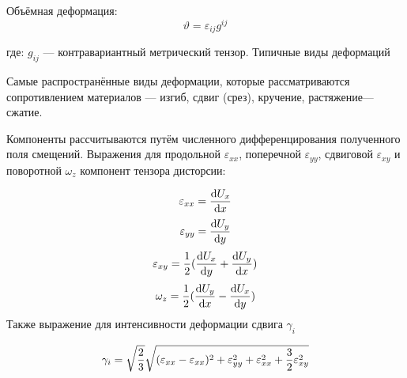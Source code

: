 Объёмная деформация: \[ \vartheta = \varepsilon_{ij} g^{ij} \]

где: $g_{ij}$ — контравариантный метрический тензор.
Типичные виды деформаций

Самые распространённые виды деформации, которые рассматриваются сопротивлением материалов — изгиб, сдвиг (срез), кручение, растяжение—сжатие.

Компоненты рассчитываются путём численного дифференцирования полученного поля смещений. Выражения для продольной $\varepsilon_{xx}$, поперечной $\varepsilon_{yy}$, сдвиговой $\varepsilon_{xy}$ и поворотной $\omega_z$ компонент тензора дисторсии:

\begin{equation}
\numberwithin{equation}{section}
\label{eq:e_xx}
\varepsilon_{xx}= \frac{\mathrm{d} U_x}{\mathrm{d} x}
\end{equation}
\begin{equation}
\numberwithin{equation}{section}
\label{eq:e_yy}
\varepsilon_{yy}= \frac{\mathrm{d} U_y}{\mathrm{d} y}
\end{equation}
\begin{equation}
\numberwithin{equation}{section}
\label{eq:e_xy}
\varepsilon_{xy}=\frac{1}{2}(\frac{\mathrm{d} U_x}{\mathrm{d} y} + \frac{\mathrm{d} U_y}{\mathrm{d} x})
\end{equation}
\begin{equation}
\numberwithin{equation}{section}
\label{eq:w_z}
\omega_z=\frac{1}{2}(\frac{\mathrm{d} U_y}{\mathrm{d} x} - \frac{\mathrm{d} U_x}{\mathrm{d} y})
\end{equation}
Также выражение для интенсивности деформации сдвига $\gamma_i$

\begin{equation}
\numberwithin{equation}{section}
\label{eq:gamma_i}
\gamma_i = \sqrt\frac{2}{3}\sqrt{(\varepsilon_{xx}-\varepsilon_{xx})^2+\varepsilon_{yy}^2+\varepsilon_{xx}^2 + \frac{3}{2}\varepsilon_{xy}^2}
\end{equation}